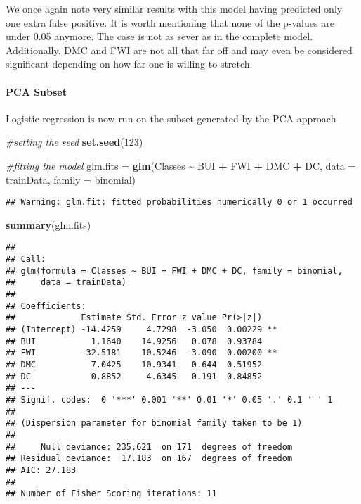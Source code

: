\documentclass[
]{article}
\newenvironment{Shaded}{\begin{snugshade}}{\end{snugshade}}
\newcommand{\AttributeTok}[1]{\textcolor[rgb]{0.13,0.29,0.53}{#1}}
\newcommand{\CommentTok}[1]{\textcolor[rgb]{0.56,0.35,0.01}{\textit{#1}}}
\newcommand{\DecValTok}[1]{\textcolor[rgb]{0.00,0.00,0.81}{#1}}
\newcommand{\FunctionTok}[1]{\textcolor[rgb]{0.13,0.29,0.53}{\textbf{#1}}}
\newcommand{\NormalTok}[1]{#1}
\newcommand{\OtherTok}[1]{\textcolor[rgb]{0.56,0.35,0.01}{#1}}
\newcommand{\SpecialCharTok}[1]{\textcolor[rgb]{0.81,0.36,0.00}{\textbf{#1}}}
\begin{document}
We once again note very similar results with this model having predicted
only one extra false positive. It is worth mentioning that none of the
p-values are under 0.05 anymore. The case is not as sever as in the
complete model. Additionally, DMC and FWI are not all that far off and
may even be considered significant depending on how far one is willing
to stretch.

\paragraph{PCA Subset}\label{pca-subset}

Logistic regression is now run on the subset generated by the PCA
approach

\begin{Shaded}
\begin{Highlighting}[]
\CommentTok{\#setting the seed}
\FunctionTok{set.seed}\NormalTok{(}\DecValTok{123}\NormalTok{)}

\CommentTok{\#fitting the model}
\NormalTok{glm.fits }\OtherTok{=} \FunctionTok{glm}\NormalTok{(Classes }\SpecialCharTok{\textasciitilde{}}\NormalTok{ BUI }\SpecialCharTok{+}\NormalTok{ FWI }\SpecialCharTok{+}\NormalTok{ DMC }\SpecialCharTok{+}\NormalTok{ DC, }\AttributeTok{data =}\NormalTok{ trainData, }\AttributeTok{family =}\NormalTok{ binomial)}
\end{Highlighting}
\end{Shaded}

\begin{verbatim}
## Warning: glm.fit: fitted probabilities numerically 0 or 1 occurred
\end{verbatim}

\begin{Shaded}
\begin{Highlighting}[]
\FunctionTok{summary}\NormalTok{(glm.fits)}
\end{Highlighting}
\end{Shaded}

\begin{verbatim}
## 
## Call:
## glm(formula = Classes ~ BUI + FWI + DMC + DC, family = binomial, 
##     data = trainData)
## 
## Coefficients:
##             Estimate Std. Error z value Pr(>|z|)   
## (Intercept) -14.4259     4.7298  -3.050  0.00229 **
## BUI           1.1640    14.9256   0.078  0.93784   
## FWI         -32.5181    10.5246  -3.090  0.00200 **
## DMC           7.0425    10.9341   0.644  0.51952   
## DC            0.8852     4.6345   0.191  0.84852   
## ---
## Signif. codes:  0 '***' 0.001 '**' 0.01 '*' 0.05 '.' 0.1 ' ' 1
## 
## (Dispersion parameter for binomial family taken to be 1)
## 
##     Null deviance: 235.621  on 171  degrees of freedom
## Residual deviance:  17.183  on 167  degrees of freedom
## AIC: 27.183
## 
## Number of Fisher Scoring iterations: 11
\end{verbatim}
\end{document}
